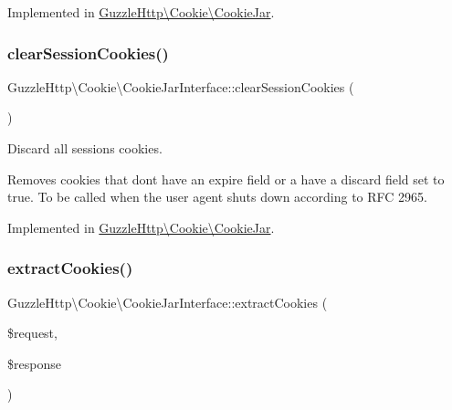 Implemented in \hyperlink{classGuzzleHttp_1_1Cookie_1_1CookieJar_a022cbce4acc7ea4beb36db01b50cb330}{Guzzle\+Http\textbackslash{}\+Cookie\textbackslash{}\+Cookie\+Jar}.

\mbox{\label{interfaceGuzzleHttp_1_1Cookie_1_1CookieJarInterface_abd31effbb05237e8c730b03951b6d3ab}} 
\subsubsection{\texorpdfstring{clear\+Session\+Cookies()}{clearSessionCookies()}}
{\footnotesize\ttfamily Guzzle\+Http\textbackslash{}\+Cookie\textbackslash{}\+Cookie\+Jar\+Interface\+::clear\+Session\+Cookies (\begin{DoxyParamCaption}{ }\end{DoxyParamCaption})}

Discard all sessions cookies.

Removes cookies that don\textquotesingle{}t have an expire field or a have a discard field set to true. To be called when the user agent shuts down according to R\+FC 2965. 

Implemented in \hyperlink{classGuzzleHttp_1_1Cookie_1_1CookieJar_a2d9a31508947248644e43d5f86defdf2}{Guzzle\+Http\textbackslash{}\+Cookie\textbackslash{}\+Cookie\+Jar}.

\mbox{\label{interfaceGuzzleHttp_1_1Cookie_1_1CookieJarInterface_a2167d5ad5dbfbe7823f0c92d60fd376d}} 
\subsubsection{\texorpdfstring{extract\+Cookies()}{extractCookies()}}
{\footnotesize\ttfamily Guzzle\+Http\textbackslash{}\+Cookie\textbackslash{}\+Cookie\+Jar\+Interface\+::extract\+Cookies (\begin{DoxyParamCaption}\item[{\hyperlink{interfacePsr_1_1Http_1_1Message_1_1RequestInterface}{Request\+Interface}}]{\$request,  }\item[{\hyperlink{interfacePsr_1_1Http_1_1Message_1_1ResponseInterface}{Response\+Interface}}]{\$response }\end{DoxyParamCaption})}

